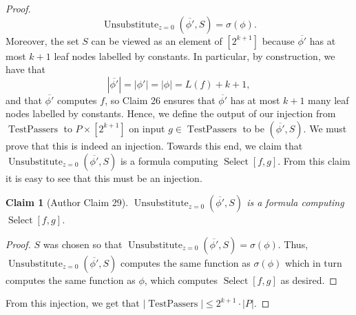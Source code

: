 \documentclass[10pt,a4paper]{article}
\newtheorem{ntclaim}[nttheorem]{Claim}
\newcommand{\Select}{\operatorname{Select}}
\newcommand{\Unsubz}{\operatorname{Unsubstitute}_{z=0}}
\begin{document}
\begin{proof}
\[\Unsubz(\overline{\phi'},S)=\sigma(\phi).\]
Moreover, the set $S$ can be viewed as an element of $[2^{k+1}]$ because $\overline{\phi'}$ has at most $k+1$ leaf nodes labelled by constants. In particular, by construction, we have that
\[|\overline{\phi'}|=|\phi'|=|\phi|=L(f)+k+1,\]
and that $\overline{\phi'}$ computes $f$, so Claim 26 ensures that $\overline{\phi'}$ has at most $k+1$ many leaf nodes labelled by constants.
Hence, we define the output of our injection from $\operatorname{TestPassers}$ to $P\times[2^{k+1}]$ on input $g\in\operatorname{TestPassers}$ to be $(\overline{\phi'},S)$.
We must prove that this is indeed an injection. Towards this end, we claim that $\Unsubz(\overline{\phi'},S)$ is a formula computing $\Select[f,g]$. From this claim it is easy to see that this must be an injection.
\begin{ntclaim}[Author Claim 29]
$\Unsubz(\overline{\phi'},S)$ is a formula computing $\Select[f,g]$.
\end{ntclaim}
\begin{proof}
$S$ was chosen so that $\Unsubz(\overline{\phi'},S)=\sigma(\phi)$. Thus, $\Unsubz(\overline{\phi'},S)$ computes the same function as $\sigma(\phi)$ which in turn computes the same function as $\phi$, which computes $\Select[f,g]$ as desired.
\end{proof}
From this injection, we get that $|\operatorname{TestPassers}|\leq 2^{k+1}\cdot|P|$.


\end{proof}
\end{document}
